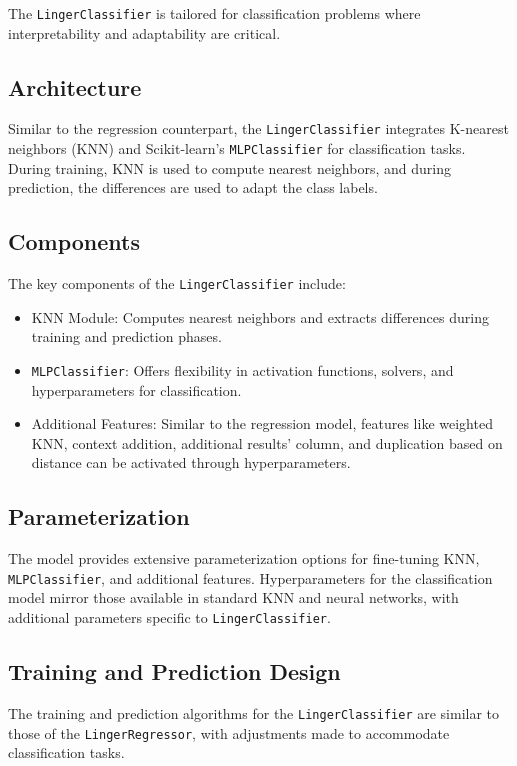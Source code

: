 \documentclass[a4paper, 12pt]{report}
\begin{document}
The \texttt{LingerClassifier} is tailored for classification problems where interpretability and adaptability are critical.

\subsection{Architecture}
Similar to the regression counterpart, the \texttt{LingerClassifier} integrates K-nearest neighbors (KNN) and Scikit-learn's \texttt{MLPClassifier} for classification tasks. 
During training, KNN is used to compute nearest neighbors, and during prediction, the differences are used to adapt the class labels.

\subsection{Components}
The key components of the \texttt{LingerClassifier} include:
\begin{itemize}
    \item KNN Module: Computes nearest neighbors and extracts differences during training and prediction phases.
    \item \texttt{MLPClassifier}: Offers flexibility in activation functions, solvers, and hyperparameters for classification.
    \item Additional Features: Similar to the regression model, features like weighted KNN, context addition, additional results' column, and duplication based on distance can be activated through hyperparameters.
\end{itemize}

\subsection{Parameterization}
The model provides extensive parameterization options for fine-tuning KNN, \texttt{MLPClassifier}, and additional features. 
Hyperparameters for the classification model mirror those available in standard KNN and neural networks, with additional parameters specific to \texttt{LingerClassifier}.

\subsection{Training and Prediction Design}
The training and prediction algorithms for the \texttt{LingerClassifier} are similar to those of the \texttt{LingerRegressor}, with adjustments made to accommodate classification tasks.
\end{document}
